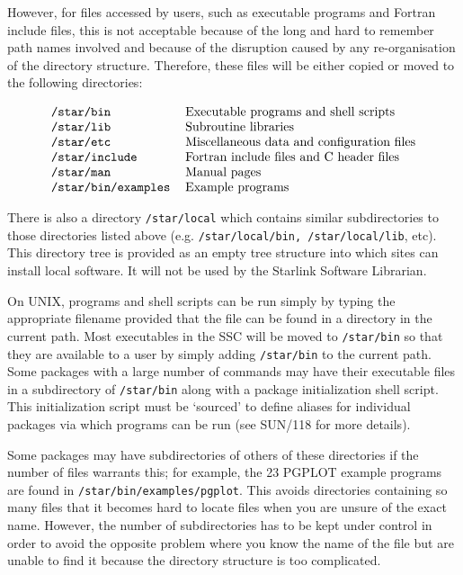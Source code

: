 However, for files accessed by users, such as executable programs
and Fortran include files, this is not acceptable because of the long and hard
to remember path names involved and because of the disruption caused by any
re-organisation of the directory structure. Therefore, these files will be
either copied or moved to the following directories:
          
{\renewcommand{\arraystretch}{1.5}
\[\begin{tabular}{ll}
\tt/star/bin & Executable programs and shell scripts\\
\tt/star/lib & Subroutine libraries\\
\tt/star/etc & Miscellaneous data and configuration files\\
\tt/star/include & Fortran include files and C header files\\
\tt/star/man & Manual pages\\
\tt/star/bin/examples & Example programs
\end{tabular}\]}


There is also a directory {\tt /star/local} which contains similar
subdirectories to those directories listed above 
(e.g. {\tt /star/local/bin,
/star/local/lib}, etc). This directory tree is provided as an empty
tree structure into which sites can install local software. 
It will not be used by
the Starlink Software Librarian. 

On UNIX, programs and shell scripts can be run simply by typing the 
appropriate filename
provided that the file can be found in a directory in
the current path.  Most executables in
the SSC will be moved to {\tt /star/bin} so that they are available to a user
by simply adding {\tt /star/bin} to the current path. Some packages with a
large number of commands may have their executable files in a subdirectory of
{\tt/star/bin} along with a package initialization shell script. 
This initialization script must be `sourced' to define aliases for 
individual packages via which programs can be run (see SUN/118 for more
details).

Some packages may have subdirectories of others of these directories
if the number of files warrants this; for example, the 23 PGPLOT example programs
are found in {\tt/star/bin/examples/pgplot}. This avoids directories containing
so many files that it becomes hard to locate files when you are unsure of the
exact name. However, the number of subdirectories has to be kept under control
in order to avoid the opposite problem where you know the name of the file 
but are unable to find it because the directory structure is too complicated.

